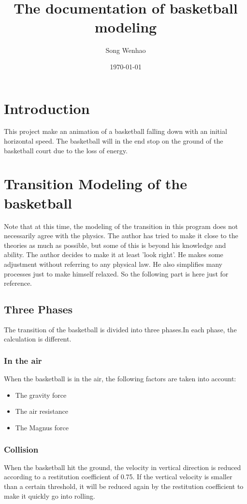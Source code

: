 \documentclass[10pt,a4paper]{article}
\begin{document}
\title{The documentation of basketball modeling}
\author{Song Wenhao}
\date{\today}
\maketitle
\section{Introduction}
This project make an animation of a basketball falling down with an initial horizontal speed. The basketball will in the end stop on the ground of the basketball court due to the loss of energy.

\section{Transition Modeling of the basketball}
Note that at this time, the modeling of the transition in this program does not necessarily agree with the physics. The author has tried to make it close to the theories as much as possible, but some of this is beyond his knowledge and ability. The author decides to make it at least 'look right'. He makes some adjustment without referring to any physical law. He also simplifies many processes just to make himself relaxed. So the following part is here just for reference.

\subsection{Three Phases}
The transition of the basketball is divided into three phases.In each phase, the calculation is different.
\subsubsection{In the air}
When the basketball is in the air, the following factors are taken into account:
\begin{itemize}
\item The gravity force
\item The air resistance
\item The Magnus force
\end{itemize}

\subsubsection{Collision}
When the basketball hit the ground, the velocity in vertical direction is reduced according to a restitution coefficient of 0.75. If the vertical velocity is smaller than a certain threshold, it will be reduced again by the restitution coefficient to make it quickly go into rolling.
\end{document}
